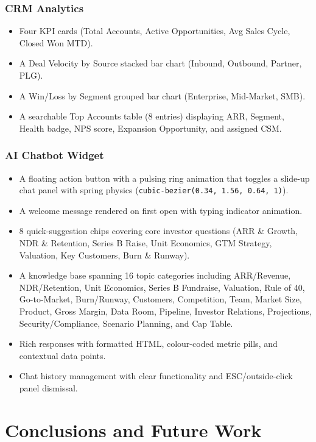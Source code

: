 \documentclass{book}
\begin{document}
\subsection{CRM Analytics}
\begin{itemize}
    \item Four KPI cards (Total Accounts, Active Opportunities, Avg Sales Cycle, Closed Won MTD).
    \item A Deal Velocity by Source stacked bar chart (Inbound, Outbound, Partner, PLG).
    \item A Win/Loss by Segment grouped bar chart (Enterprise, Mid-Market, SMB).
    \item A searchable Top Accounts table (8 entries) displaying ARR, Segment, Health badge, NPS score, Expansion Opportunity, and assigned CSM.
\end{itemize}

\subsection{AI Chatbot Widget}
\begin{itemize}
    \item A floating action button with a pulsing ring animation that toggles a slide-up chat panel with spring physics (\texttt{cubic-bezier(0.34, 1.56, 0.64, 1)}).
    \item A welcome message rendered on first open with typing indicator animation.
    \item 8 quick-suggestion chips covering core investor questions (ARR \& Growth, NDR \& Retention, Series B Raise, Unit Economics, GTM Strategy, Valuation, Key Customers, Burn \& Runway).
    \item A knowledge base spanning 16 topic categories including ARR/Revenue, NDR/Retention, Unit Economics, Series B Fundraise, Valuation, Rule of 40, Go-to-Market, Burn/Runway, Customers, Competition, Team, Market Size, Product, Gross Margin, Data Room, Pipeline, Investor Relations, Projections, Security/Compliance, Scenario Planning, and Cap Table.
    \item Rich responses with formatted HTML, colour-coded metric pills, and contextual data points.
    \item Chat history management with clear functionality and ESC/outside-click panel dismissal.
\end{itemize}

\chapter{Conclusions and Future Work}
\end{document}
